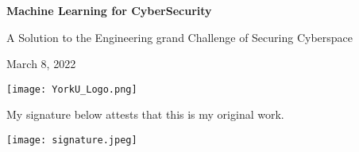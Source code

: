 \begin{titlepage}
    \begin{center}
        \vspace*{1cm}

        \Huge\textbf{Machine Learning for CyberSecurity}

        \vspace*{0.5cm}

        \LARGE A Solution to the Engineering grand Challenge of Securing Cyberspace

        \vspace*{1.5cm}

        \Large March 8, 2022

        \vfill

        \texttt{[image: YorkU\_Logo.png]}

        \vspace*{1cm}

        \large My signature below attests that this is my original work.

        \texttt{[image: signature.jpeg]}
    \end{center}
\end{titlepage}